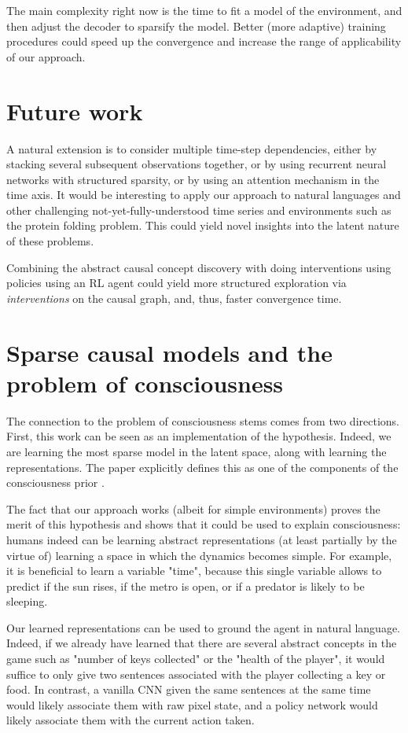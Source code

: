 \documentclass[a4paper,11pt,oneside]{report}
\begin{document}
The main complexity right now is the time to fit a model of the environment, and then adjust the decoder to sparsify the model. Better (more adaptive) training procedures could speed up the convergence and increase the range of applicability of our approach.

\section{Future work}
A natural extension is to consider multiple time-step dependencies, either by stacking several subsequent observations together, or by using recurrent neural networks with structured sparsity, or by using an attention mechanism in the time axis. It would be interesting to apply our approach to natural languages and other challenging not-yet-fully-understood time series and environments such as the protein folding problem. This could yield novel insights into the latent nature of these problems.

Combining the abstract causal concept discovery with doing interventions using policies\cite{Volodin2020} using an RL agent could yield more structured exploration via {\em interventions} on the causal graph\cite{He2008,Frisch2014,Pathak2017}, and, thus, faster convergence time.


\section{Sparse causal models and the problem of consciousness}
The connection to the problem of consciousness stems comes from two directions. First, this work can be seen as an implementation of the \cite{Bengio2017} hypothesis. Indeed, we are learning the most sparse model in the latent space, along with learning the representations. The paper explicitly defines this as one of the components of the consciousness prior \cite{Bengio2017}.


The fact that our approach works (albeit for simple environments) proves the merit of this hypothesis and shows that it could be used to explain consciousness: humans indeed can be learning abstract representations (at least partially by the virtue of) learning a space in which the dynamics becomes simple. For example, it is beneficial to learn a variable "time", because this single variable allows to predict if the sun rises, if the metro is open, or if a predator is likely to be sleeping.

Our learned representations can be used to ground the agent in natural language. Indeed, if we already have learned that there are several abstract concepts in the game such as "number of keys collected" or the "health of the player", it would suffice to only give two sentences associated with the player collecting a key or food. In contrast, a vanilla CNN given the same sentences at the same time would likely associate them with raw pixel state, and a policy network would likely associate them with the current action taken.
\end{document}
